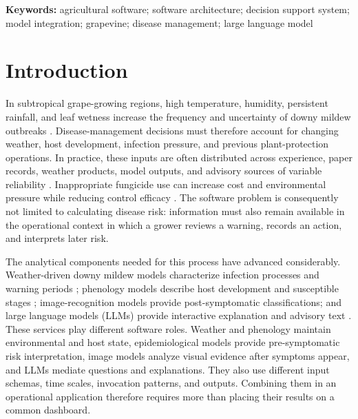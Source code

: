 \documentclass[12pt]{article}
\begin{document}
\noindent\textbf{Keywords:} agricultural software; software architecture; decision support system; model integration; grapevine; disease management; large language model

\section{Introduction}\label{introduction}

In subtropical grape-growing regions, high temperature, humidity, persistent rainfall, and leaf wetness increase the frequency and uncertainty of downy mildew outbreaks \citep{gesslerPlasmoparaViticolaReview2011,yuEffectsRainShelter2017}. Disease-management decisions must therefore account for changing weather, host development, infection pressure, and previous plant-protection operations. In practice, these inputs are often distributed across experience, paper records, weather products, model outputs, and advisory sources of variable reliability \citep{tummersObstaclesFeaturesFarm2019,yaoInfluenceInformationSources2025}. Inappropriate fungicide use can increase cost and environmental pressure while reducing control efficacy \citep{oliverFungicideUsePatterns2023,zubrodFungicidesOverlookedPesticide2019}. The software problem is consequently not limited to calculating disease risk: information must also remain available in the operational context in which a grower reviews a warning, records an action, and interprets later risk.

The analytical components needed for this process have advanced considerably. Weather-driven downy mildew models characterize infection processes and warning periods \citep{rossiMechanisticModelSimulating2008,caffiEvaluationDynamicModel2011}; phenology models describe host development and susceptible stages \citep{parkerGeneralPhenologicalModel2011a,wangAssessingGrapevinePhenological2020}; image-recognition models provide post-symptomatic classifications; and large language models (LLMs) provide interactive explanation and advisory text \citep{raiAdvancingSitespecificDisease2026,yanCDIPChatGLM3DualmodelApproach2025}. These services play different software roles. Weather and phenology maintain environmental and host state, epidemiological models provide pre-symptomatic risk interpretation, image models analyze visual evidence after symptoms appear, and LLMs mediate questions and explanations. They also use different input schemas, time scales, invocation patterns, and outputs. Combining them in an operational application therefore requires more than placing their results on a common dashboard.
\end{document}
